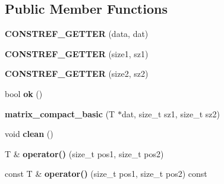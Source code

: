 \subsection*{Public Member Functions}
\begin{DoxyCompactItemize}
\item 
{\bfseries C\+O\+N\+S\+T\+R\+E\+F\+\_\+\+G\+E\+T\+T\+ER} (data, dat)\hypertarget{classmalgo_1_1matrix__compact__basic_a09617d0e22613534af7215e58d751b28}{}\label{classmalgo_1_1matrix__compact__basic_a09617d0e22613534af7215e58d751b28}

\item 
{\bfseries C\+O\+N\+S\+T\+R\+E\+F\+\_\+\+G\+E\+T\+T\+ER} (size1, sz1)\hypertarget{classmalgo_1_1matrix__compact__basic_a3801d93250d0337b2e3a547f60a9f824}{}\label{classmalgo_1_1matrix__compact__basic_a3801d93250d0337b2e3a547f60a9f824}

\item 
{\bfseries C\+O\+N\+S\+T\+R\+E\+F\+\_\+\+G\+E\+T\+T\+ER} (size2, sz2)\hypertarget{classmalgo_1_1matrix__compact__basic_a6154a317653fb66f44faa0a02d3a5996}{}\label{classmalgo_1_1matrix__compact__basic_a6154a317653fb66f44faa0a02d3a5996}

\item 
bool {\bfseries ok} ()\hypertarget{classmalgo_1_1matrix__compact__basic_a579887ab27c822329cc1de530601e5df}{}\label{classmalgo_1_1matrix__compact__basic_a579887ab27c822329cc1de530601e5df}

\item 
{\bfseries matrix\+\_\+compact\+\_\+basic} (T $\ast$dat, size\+\_\+t sz1, size\+\_\+t sz2)\hypertarget{classmalgo_1_1matrix__compact__basic_a867b801aa23f904307c214c93db8d018}{}\label{classmalgo_1_1matrix__compact__basic_a867b801aa23f904307c214c93db8d018}

\item 
void {\bfseries clean} ()\hypertarget{classmalgo_1_1matrix__compact__basic_a509ed4baa80359d0f66fa8c73bcc91a6}{}\label{classmalgo_1_1matrix__compact__basic_a509ed4baa80359d0f66fa8c73bcc91a6}

\item 
T \& {\bfseries operator()} (size\+\_\+t pos1, size\+\_\+t pos2)\hypertarget{classmalgo_1_1matrix__compact__basic_aacb400c2c0028b9a1eb33a3744106729}{}\label{classmalgo_1_1matrix__compact__basic_aacb400c2c0028b9a1eb33a3744106729}

\item 
const T \& {\bfseries operator()} (size\+\_\+t pos1, size\+\_\+t pos2) const \hypertarget{classmalgo_1_1matrix__compact__basic_a0816e9c0a56026c5e35a6c7558ff9d23}{}\label{classmalgo_1_1matrix__compact__basic_a0816e9c0a56026c5e35a6c7558ff9d23}


\end{DoxyCompactItemize}
